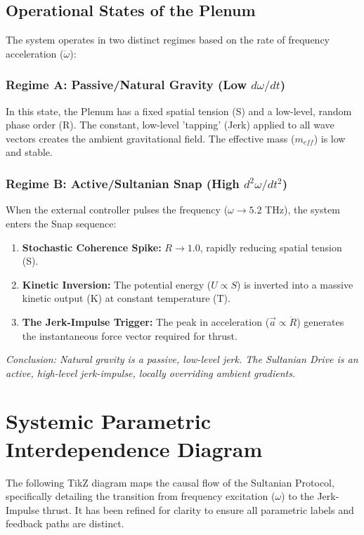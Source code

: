 \documentclass[11pt]{article}
\begin{document}
\subsection{Operational States of the Plenum}
The system operates in two distinct regimes based on the rate of frequency acceleration ($\ddot{\omega}$):

\subsubsection{Regime A: Passive/Natural Gravity (Low $d\omega/dt$)}
In this state, the Plenum has a fixed spatial tension (S) and a low-level, random phase order (R). The constant, low-level 'tapping' (Jerk) applied to all wave vectors creates the ambient gravitational field. The effective mass ($m_{eff}$) is low and stable.

\subsubsection{Regime B: Active/Sultanian Snap (High $d^2\omega/dt^2$)}
When the external controller pulses the frequency ($\omega \to 5.2$ THz), the system enters the Snap sequence:
\begin{enumerate}
    \item \textbf{Stochastic Coherence Spike:} $R \to 1.0$, rapidly reducing spatial tension (S).
    \item \textbf{Kinetic Inversion:} The potential energy ($U \propto S$) is inverted into a massive kinetic output (K) at constant temperature (T).
    \item \textbf{The Jerk-Impulse Trigger:} The peak in acceleration ($\vec{a} \propto \ddot{R}$) generates the instantaneous force vector required for thrust.
\end{enumerate}
\textit{Conclusion: Natural gravity is a passive, low-level jerk. The Sultanian Drive is an active, high-level jerk-impulse, locally overriding ambient gradients.}

\section{Systemic Parametric Interdependence Diagram}

The following TikZ diagram maps the causal flow of the Sultanian Protocol, specifically detailing the transition from frequency excitation ($\omega$) to the Jerk-Impulse thrust. It has been refined for clarity to ensure all parametric labels and feedback paths are distinct.
\end{document}
